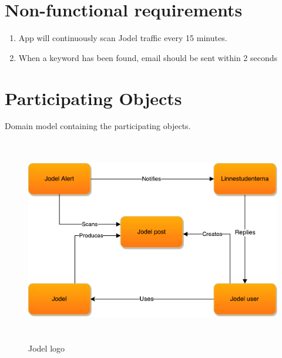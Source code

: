 \documentclass[a4paper,12pt]{article}
\begin{document}
\section{Non-functional requirements}
\begin{enumerate}
	\item App will continuously scan Jodel traffic every 15 minutes.
	\item When a keyword has been found, email should be sent within 2 seconds
\end{enumerate}
\section{Participating Objects}
Domain model containing the participating objects.\\

\begin{figure}[!h]
	\centering
	\includegraphics[height=9cm]{img/ParticipatingObjects.pdf}
	\caption{Jodel logo}
	\label{Cisco routing}
\end{figure}
\end{document}
